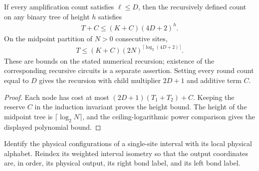 \begin{lemma}
    \label{thm:mpu_actual_tree_gate_count}
    \leanok
    If every amplification count satisfies $\ell\leq D$, then the
    recursively defined count on any binary tree of height $h$
    satisfies
    \begin{align}
        T+C\leq(K+C)(4D+2)^h.
    \end{align}
    On the midpoint partition of $N>0$ consecutive sites,
    \begin{align}
        T\leq(K+C)(2N)^{\lceil\log_2(4D+2)\rceil}.
    \end{align}
    These are bounds on the stated numerical recursion; existence
    of the corresponding recursive circuits is a separate assertion.
    Setting every round count equal to $D$ gives the recursion
    with child multiplier $2D+1$ and additive term $C$.
\end{lemma}
\begin{proof}\leanok
    Each node has cost at most $(2D+1)(T_1+T_2)+C$.
    Keeping the reserve $C$ in the induction invariant proves the
    height bound. The height of the midpoint tree is
    $\lceil\log_2N\rceil$, and the ceiling-logarithmic power comparison
    gives the displayed polynomial bound.
\end{proof}

\begin{definition}
    \label{def:mpu_minimal_leaf_intervals}
    \leanok
    Identify the physical configurations of a single-site interval
    with its local physical alphabet. Reindex its weighted interval
    isometry so that the output coordinates are, in order, its
    physical output, its right bond label, and its left bond label.
\end{definition}

